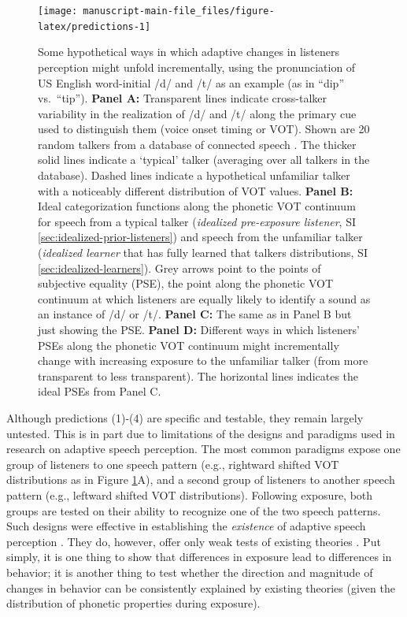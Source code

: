 \documentclass[
  11pt,
  man,mask,floatsintext]{apa6}
\begin{document}
\begin{figure}[H]

{\centering \texttt{[image: manuscript-main-file\_files/figure-latex/predictions-1]} 

}

\caption{Some hypothetical ways in which adaptive changes in listeners perception might unfold incrementally, using the pronunciation of US English word-initial /d/ and /t/ as an example (as in ``dip'' vs.~``tip''). \textbf{Panel A:} Transparent lines indicate cross-talker variability in the realization of /d/ and /t/ along the primary cue used to distinguish them (voice onset timing or VOT). Shown are 20 random talkers from a database of connected speech \autocite{chodroff-wilson2018}. The thicker solid lines indicate a `typical' talker (averaging over all talkers in the database). Dashed lines indicate a hypothetical unfamiliar talker with a noticeably different distribution of VOT values. \textbf{Panel B:} Ideal categorization functions along the phonetic VOT continuum for speech from a typical talker (\emph{idealized pre-exposure listener}, SI \ref{sec:idealized-prior-listeners}) and speech from the unfamiliar talker (\emph{idealized learner} that has fully learned that talkers distributions, SI \ref{sec:idealized-learners}). Grey arrows point to the points of subjective equality (PSE), the point along the phonetic VOT continuum at which listeners are equally likely to identify a sound as an instance of /d/ or /t/. \textbf{Panel C:} The same as in Panel B but just showing the PSE. \textbf{Panel D:} Different ways in which listeners' PSEs along the phonetic VOT continuum might incrementally change with increasing exposure to the unfamiliar talker (from more transparent to less transparent). The horizontal lines indicates the ideal PSEs from Panel C.}\label{fig:predictions}
\end{figure}

Although predictions (1)-(4) are specific and testable, they remain largely untested. This is in part due to limitations of the designs and paradigms used in research on adaptive speech perception. The most common paradigms expose one group of listeners to one speech pattern (e.g., rightward shifted VOT distributions as in Figure \ref{fig:predictions}A), and a second group of listeners to another speech pattern (e.g., leftward shifted VOT distributions). Following exposure, both groups are tested on their ability to recognize one of the two speech patterns. Such designs were effective in establishing the \emph{existence} of adaptive speech perception \autocite[see also][]{cummings-theodore2023}. They do, however, offer only weak tests of existing theories \autocite[for demonstration, see][]{xie2023}. Put simply, it is one thing to show that differences in exposure lead to differences in behavior; it is another thing to test whether the direction and magnitude of changes in behavior can be consistently explained by existing theories (given the distribution of phonetic properties during exposure).
\end{document}
